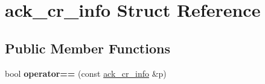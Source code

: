 \hypertarget{structack__cr__info}{\section{ack\-\_\-cr\-\_\-info Struct Reference}
\label{structack__cr__info}
}
\subsection*{Public Member Functions}
\begin{DoxyCompactItemize}
\item 
\hypertarget{structack__cr__info_a26bf03e8d05773efdd0b6b011cf5b85b}{bool {\bfseries operator==} (const \hyperlink{structack__cr__info}{ack\-\_\-cr\-\_\-info} \&p)}\label{structack__cr__info_a26bf03e8d05773efdd0b6b011cf5b85b}

\end{DoxyCompactItemize}
